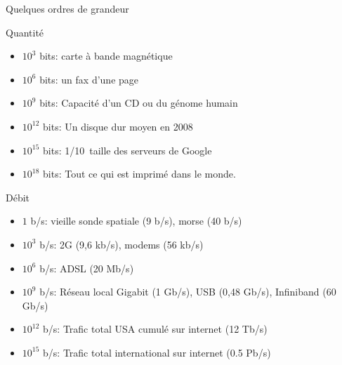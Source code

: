 \begin{frame}{Quelques ordres de grandeur}
  \begin{block}{Quantité}
    \begin{itemize}
    \item $10^3$ bits: carte à bande magnétique
    \item $10^6$ bits: un fax d'une page
    \item $10^9$ bits: Capacité d'un CD ou du génome humain
    \item $10^{12}$ bits: Un disque dur moyen en 2008
    \item $10^{15}$ bits: 1/10\ieme\ taille des serveurs de Google
    \item $10^{18}$ bits: Tout ce qui est imprimé dans le monde.
    \end{itemize}
  \end{block}
  \begin{block}{Débit}
    \begin{itemize}
    \item $1$ b/s: vieille sonde spatiale (9 b/s), morse (40 b/s)
    \item $10^3$ b/s: 2G (9,6 kb/s), modems (56 kb/s)
    \item $10^6$ b/s: ADSL (20 Mb/s)
    \item $10^9$ b/s: Réseau local Gigabit (1 Gb/s), USB (0,48 Gb/s), Infiniband (60 Gb/s)
    \item $10^{12}$ b/s: Trafic total USA cumulé sur internet (12 Tb/s)
    \item $10^{15}$ b/s: Trafic total international sur internet (0.5 Pb/s)
    \end{itemize}
  \end{block}
\end{frame}
